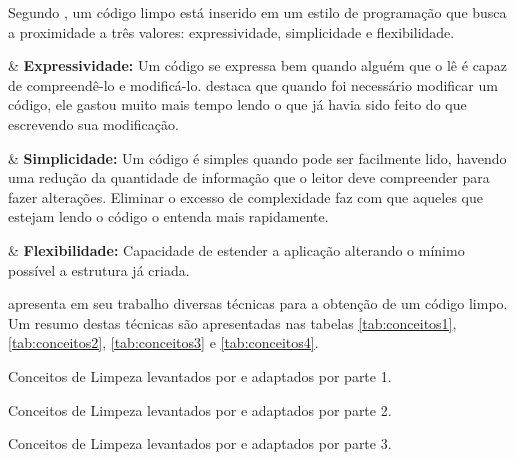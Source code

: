 Segundo , um código limpo está inserido em um estilo de programação que busca a proximidade a três valores: expressividade, simplicidade e flexibilidade.	

\begin{easylist}[itemize]

	& \textbf{Expressividade:} Um código se expressa bem quando alguém que o lê é capaz de compreendê-lo e modificá-lo.  destaca que quando foi necessário modificar um código, ele gastou muito mais tempo lendo o que já havia sido feito do que escrevendo sua modificação. 
		
	& \textbf{Simplicidade:} Um código é simples quando pode ser facilmente lido, havendo uma redução da quantidade de informação que o leitor deve compreender para fazer alterações. Eliminar o excesso de complexidade faz com que aqueles que estejam lendo o código o entenda mais rapidamente. 

	& \textbf{Flexibilidade:} Capacidade de estender a aplicação alterando o mínimo possível a estrutura já criada.
		
\end{easylist}

 apresenta em seu trabalho diversas técnicas para a obtenção de um código limpo. Um resumo destas técnicas são apresentadas nas tabelas \ref{tab:conceitos1}, \ref{tab:conceitos2}, \ref{tab:conceitos3} e \ref{tab:conceitos4}.


\begin{table}[!ht]
\centering

\caption{Conceitos de Limpeza levantados por  e adaptados por  parte 1.}
\label{tab:conceitos1}
\end{table}
\FloatBarrier

\begin{table}[!ht]
\centering

\caption{Conceitos de Limpeza levantados por  e adaptados por  parte 2.}
\label{tab:conceitos2}
\end{table}
\FloatBarrier

\begin{table}[!ht]
\centering

\caption{Conceitos de Limpeza levantados por  e adaptados por  parte 3.} 
\label{tab:conceitos3}
\end{table}
\FloatBarrier

